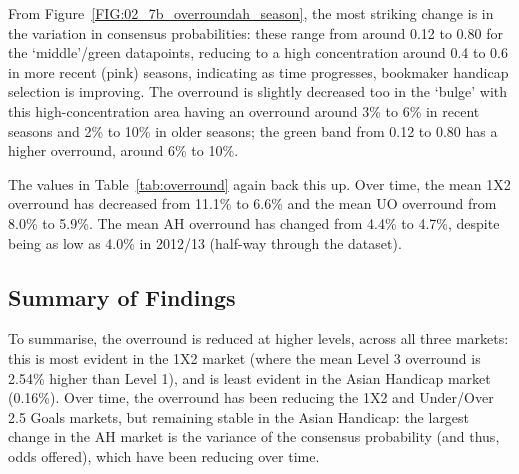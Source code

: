 \documentclass[a4paper,10pt]{report}
\begin{document}
From Figure~\ref{FIG:02_7b_overroundah_season}, the most striking change is in the variation in consensus probabilities: these range from around 0.12 to 0.80 for the `middle'/green datapoints, reducing to a high concentration around 0.4 to 0.6 in more recent (pink) seasons, indicating as time progresses, bookmaker handicap selection is improving. The overround is slightly decreased too in the `bulge' with this high-concentration area having an overround around 3\% to 6\% in recent seasons and 2\% to 10\% in older seasons; the green band from 0.12 to 0.80 has a higher overround, around 6\% to 10\%.\vspace{3mm}

The values in Table~\ref{tab:overround} again back this up. Over time, the mean 1X2 overround has decreased from 11.1\% to 6.6\% and the mean UO overround from 8.0\% to 5.9\%. The mean AH overround has changed from 4.4\% to 4.7\%, despite being as low as 4.0\% in 2012/13 (half-way through the dataset). \vspace{3mm}

\subsection*{Summary of Findings}
To summarise, the overround is reduced at higher levels, across all three markets: this is most evident in the 1X2 market (where the mean Level 3 overround is 2.54\% higher than Level 1), and is least evident in the Asian Handicap market (0.16\%). Over time, the overround has been reducing the 1X2 and Under/Over 2.5 Goals markets, but remaining stable in the Asian Handicap: the largest change in the AH market is the variance of the consensus probability (and thus, odds offered), which have been reducing over time.

\pagebreak
\end{document}
